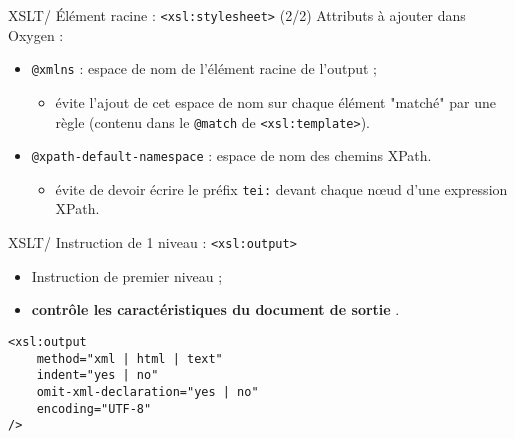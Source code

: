 \documentclass{beamer}
\begin{document}
    \begin{frame}{XSLT/ Élément racine : \texttt{<xsl:stylesheet>} (2/2)}
    \Large
    Attributs à ajouter dans Oxygen :
    \bigskip
        \begin{itemize}
            \item \texttt{@xmlns} : espace de nom de l'élément racine de l'output ;
            \begin{itemize}
            \large
                \item évite l'ajout de cet espace de nom sur chaque élément "matché" par une règle (contenu dans le \texttt{@match} de \texttt{<xsl:template>}).
            \end{itemize}
            \bigskip
            \item \texttt{@xpath-default-namespace} :  espace de nom des chemins XPath.
            \begin{itemize}
            \large
                \item évite de devoir écrire le préfix \texttt{tei:} devant chaque n\oe ud d'une expression XPath.
            \end{itemize}
        \end{itemize}
    \end{frame}

    \begin{frame}[fragile]{XSLT/ Instruction de 1 niveau : \texttt{<xsl:output>}}
    \Large
        \begin{itemize}
            \item Instruction de premier niveau ;
            \item \og \textbf{contrôle les caractéristiques du document de sortie} \fg.
        \end{itemize}

        \begin{verbatim}
<xsl:output
    method="xml | html | text"
    indent="yes | no"
    omit-xml-declaration="yes | no"
    encoding="UTF-8"
/>
        \end{verbatim}
    \end{frame}
\end{document}

